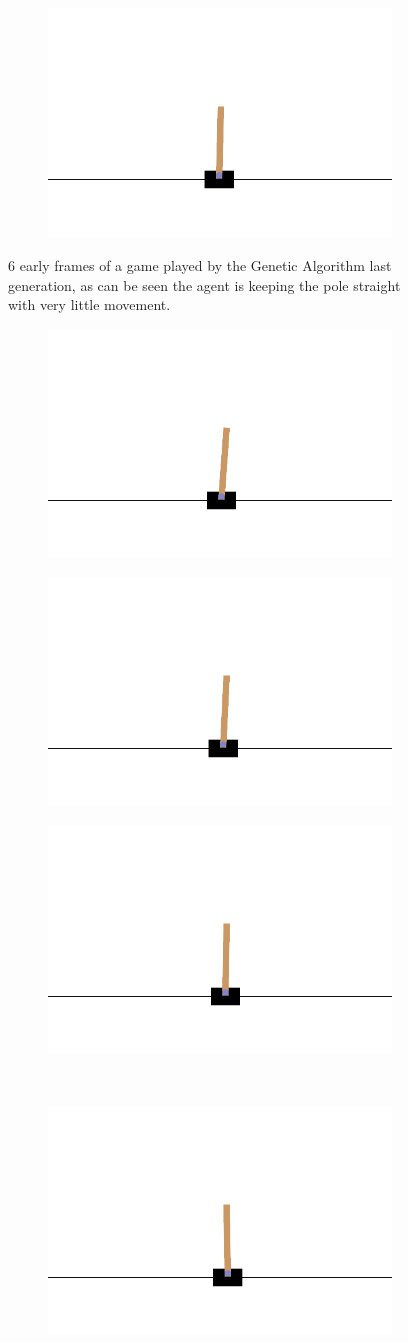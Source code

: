 \begin{figure}[H]
	\hfill
	\begin{subfigure}
		\centering
		\includegraphics[width=0.3\linewidth]{Images/frames/GA/21.png}
	\end{subfigure}
	\caption{6 early frames of a game played by the Genetic Algorithm last generation, as can be seen the agent is keeping the pole straight with very little movement.}
	\label{fig:framesGA}
\end{figure}

\begin{figure}[H]
	\centering
	\begin{subfigure}
		\centering
		\includegraphics[width=0.3\linewidth]{Images/frames/RL/6.png}
	\end{subfigure}
	\hfill
	\begin{subfigure}
		\centering
		\includegraphics[width=0.3\linewidth]{Images/frames/RL/9.png}
	\end{subfigure}
	\hfill
	\begin{subfigure}
		\centering
		\includegraphics[width=0.3\linewidth]{Images/frames/RL/12.png}
	\end{subfigure}
	\\
	\begin{subfigure}
		\centering
		\includegraphics[width=0.3\linewidth]{Images/frames/RL/15.png}

\end{subfigure}
\end{figure}
